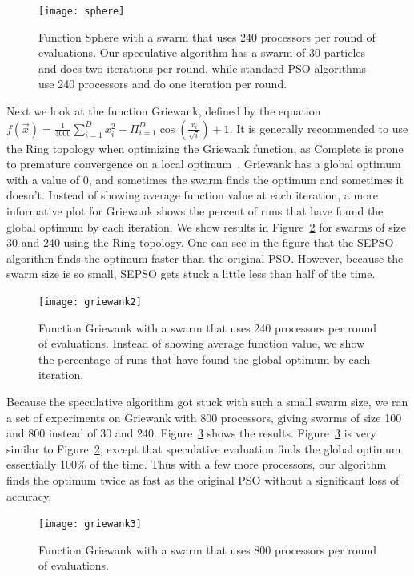 \documentclass[journal,letterpaper]{IEEEtran}
\newcommand{\fig}[1]{Figure~\ref{fig:#1}}
\begin{document}
\begin{figure}
  \centering
  \texttt{[image: sphere]}
  \caption{Function Sphere with a swarm that uses 240 processors per round of
  evaluations.  Our speculative algorithm has a swarm of 30 particles and does
  two iterations per round, while standard PSO algorithms use 240 processors
  and do one iteration per round.}
  \label{fig:basic-sphere}
\end{figure}

Next we look at the function Griewank, defined by the equation $f(\Vec{x}) =
\frac{1}{4000} \sum_{i=1}^D x_i^2 - \Pi_{i=1}^D \cos\left(\frac{x_i}{\sqrt{i}}
\right) + 1$.  It is generally recommended to use the Ring topology when
optimizing the Griewank function, as Complete is prone to premature convergence
on a local optimum~\cite{bratton-2007-defining-a-standard-for-pso}.  Griewank
has a global optimum with a value of 0, and sometimes the swarm finds the
optimum and sometimes it doesn't.  Instead of showing average function value at
each iteration, a more informative plot for Griewank shows the percent of runs
that have found the global optimum by each iteration.  We show results in
\fig{basic-griewank2} for swarms of size 30 and 240 using the Ring topology.
One can see in the figure that the SEPSO algorithm finds the optimum faster
than the original PSO.  However, because the swarm size is so small, SEPSO gets
stuck a little less than half of the time.

\begin{figure}
  \centering
  \texttt{[image: griewank2]}
  \caption{Function Griewank with a swarm that uses 240 processors per round of
  evaluations.  Instead of showing average function value, we show the
  percentage of runs that have found the global optimum by each iteration.}
  \label{fig:basic-griewank2}
\end{figure}

Because the speculative algorithm got stuck with such a small swarm size, we
ran a set of experiments on Griewank with 800 processors, giving swarms of size
100 and 800 instead of 30 and 240.  \fig{basic-griewank3} shows the results.
\fig{basic-griewank3} is very similar to \fig{basic-griewank2}, except that
speculative evaluation finds the global optimum essentially 100\% of the time.
Thus with a few more processors, our algorithm finds the optimum twice as fast
as the original PSO without a significant loss of accuracy.

\begin{figure}
  \centering
  \texttt{[image: griewank3]}
  \caption{Function Griewank with a swarm that uses 800 processors per round of
  evaluations.}
  \label{fig:basic-griewank3}
\end{figure}
\end{document}
